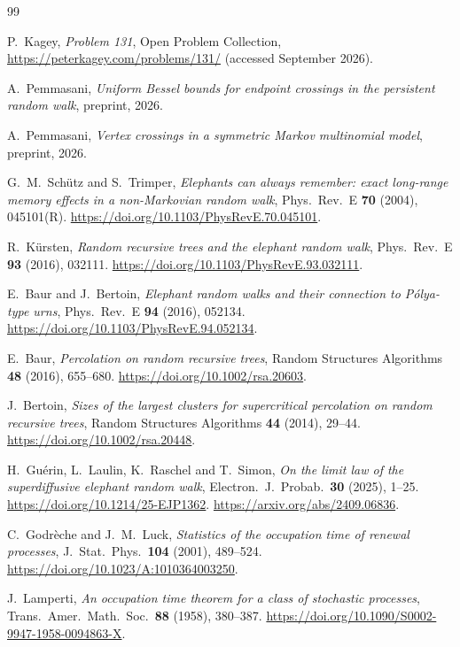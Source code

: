\documentclass[11pt]{article}
\theoremstyle{definition}
\theoremstyle{remark}
\begin{document}
\begin{thebibliography}{99}\small\setlength{\baselineskip}{11pt}\setlength{\itemsep}{0pt}\setlength{\parsep}{0pt}

P.~Kagey, \emph{Problem 131}, Open Problem Collection,
\url{https://peterkagey.com/problems/131/} (accessed September 2026).

A.~Pemmasani, \emph{Uniform Bessel bounds for endpoint crossings in the
persistent random walk}, preprint, 2026.

A.~Pemmasani, \emph{Vertex crossings in a symmetric Markov multinomial
model}, preprint, 2026.

G.~M.~Sch\"utz and S.~Trimper, \emph{Elephants can always remember: exact
long-range memory effects in a non-Markovian random walk}, Phys.\ Rev.\ E
\textbf{70} (2004), 045101(R).
\url{https://doi.org/10.1103/PhysRevE.70.045101}.

R.~K\"ursten, \emph{Random recursive trees and the elephant random walk},
Phys.\ Rev.\ E \textbf{93} (2016), 032111.
\url{https://doi.org/10.1103/PhysRevE.93.032111}.

E.~Baur and J.~Bertoin, \emph{Elephant random walks and their connection to
P\'olya-type urns}, Phys.\ Rev.\ E \textbf{94} (2016), 052134.
\url{https://doi.org/10.1103/PhysRevE.94.052134}.

E.~Baur, \emph{Percolation on random recursive trees}, Random Structures
Algorithms \textbf{48} (2016), 655--680.
\url{https://doi.org/10.1002/rsa.20603}.

J.~Bertoin, \emph{Sizes of the largest clusters for supercritical percolation
on random recursive trees}, Random Structures Algorithms \textbf{44} (2014),
29--44. \url{https://doi.org/10.1002/rsa.20448}.

H.~Gu\'erin, L.~Laulin, K.~Raschel and T.~Simon, \emph{On the limit law of
the superdiffusive elephant random walk}, Electron.\ J.\ Probab.\
\textbf{30} (2025), 1--25. \url{https://doi.org/10.1214/25-EJP1362}.
\url{https://arxiv.org/abs/2409.06836}.

C.~Godr\`eche and J.~M.~Luck, \emph{Statistics of the occupation time of
renewal processes}, J.\ Stat.\ Phys.\ \textbf{104} (2001), 489--524.
\url{https://doi.org/10.1023/A:1010364003250}.

J.~Lamperti, \emph{An occupation time theorem for a class of stochastic
processes}, Trans.\ Amer.\ Math.\ Soc.\ \textbf{88} (1958), 380--387.
\url{https://doi.org/10.1090/S0002-9947-1958-0094863-X}.


\end{thebibliography}
\end{document}
